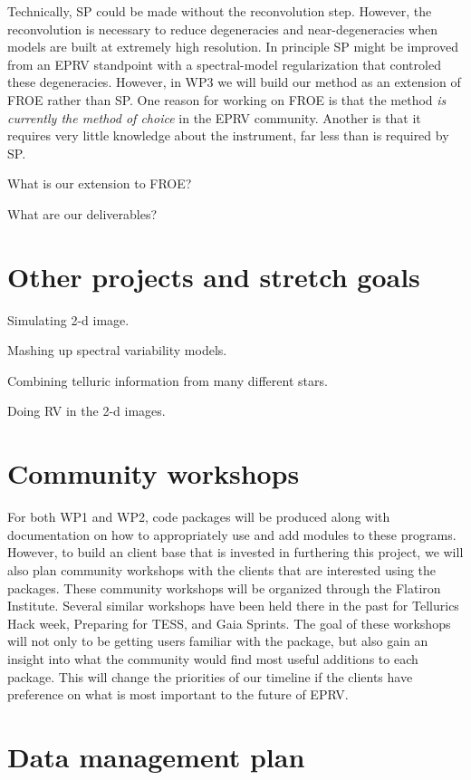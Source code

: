 \documentclass[12pt]{article}
\begin{document}
Technically, SP could be made without the reconvolution step.
However, the reconvolution is necessary to reduce degeneracies and near-degeneracies when models are built at extremely high resolution.
In principle SP might be improved from an EPRV standpoint with a spectral-model regularization that controled these degeneracies.
However, in WP3 we will build our method as an extension of FROE rather than SP.
One reason for working on FROE is that the method \emph{is currently the method of choice} in the EPRV community.
Another is that it requires very little knowledge about the instrument, far less than is required by SP.

What is our extension to FROE?

What are our deliverables?

\section{Other projects and stretch goals}

Simulating 2-d image.

Mashing up spectral variability models.

Combining telluric information from many different stars.

Doing RV in the 2-d images.

\section{Community workshops}

For both WP1 and WP2, code packages will be produced along with documentation on how to appropriately use and add modules to these programs. However, to build an client base that is invested in furthering this project, we will also plan community workshops with the clients that are interested using the packages. These community workshops will be organized through the Flatiron Institute. Several similar workshops have been held there in the past for Tellurics Hack week, Preparing for TESS, and Gaia Sprints. The goal of these workshops will not only to be getting users familiar with the package, but also gain an insight into what the community would find most useful additions to each package. This will change the priorities of our timeline if the clients have preference on what is most important to the future of EPRV.

\section{Data management plan}
\end{document}
